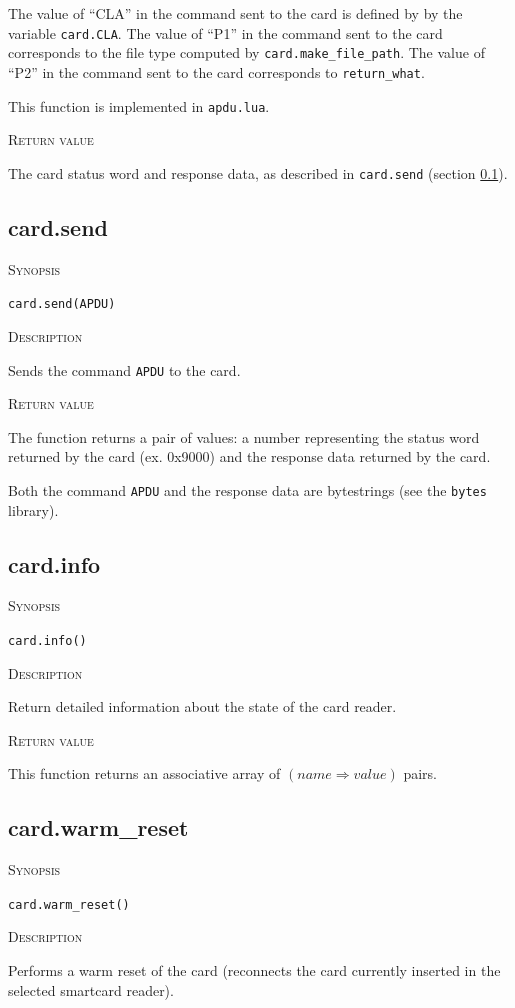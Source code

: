 \documentclass[11pt]{report}
\newcommand{\mansection}[1]{\vspace{0.5em}\par\noindent\textsc{#1}\vspace{0.5em}\par}
\newcommand{\syn}[1]{\texttt{#1}}
\begin{document}
  The value of ``CLA'' in the command sent to the card is defined by by the variable \syn{card.CLA}.
  The value of ``P1'' in the command sent to the card corresponds to the file type computed by \syn{card.make\_file\_path}.
  The value of ``P2'' in the command sent to the card corresponds to \syn{return\_what}.

  This function is implemented in \syn{apdu.lua}.

\mansection{Return value}
  The card status word and response data, as described in \syn{card.send} (section \ref{sec:card_send}).


\subsection{card.send}
\label{sec:card_send}

\mansection{Synopsis}
\syn{card.send(APDU)}

\mansection{Description}
  Sends the command \syn{APDU} to the card. 

\mansection{Return value}
  The function returns a pair of values: a number representing the status word 
  returned by the card (ex. 0x9000) and the response data returned by the card.
  
  Both the command \syn{APDU} and the response data are bytestrings 
  (see the \syn{bytes} library).


\subsection{card.info}

\mansection{Synopsis}
\syn{card.info()}

\mansection{Description}
  Return detailed information about the state of the card reader.

\mansection{Return value}
  This function returns an associative array of $(name \Rightarrow value)$ pairs.


\subsection{card.warm\_reset}

\mansection{Synopsis}
\syn{card.warm\_reset()}

\mansection{Description}
  Performs a warm reset of the card 
  (reconnects the card currently inserted in the selected smartcard reader).
\end{document}
